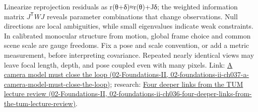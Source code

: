 Linearize reprojection residuals as r(θ+δ)≈r(θ)+Jδ; the weighted information matrix \(J^{\mathsf T}WJ\) reveals parameter combinations that change observations. Null directions are local ambiguities, while small eigenvalues indicate weak constraints. In calibrated monocular structure from motion, global frame choice and common scene scale are gauge freedoms. Fix a pose and scale convention, or add a metric measurement, before interpreting covariance. Repeated nearly identical views may leave focal length, depth, and pose coupled even with many pixels. Link: \href{../02-Foundations-II/main.pdf\#nameddest=02-foundations-ii-ch037-a-camera-model-must-close-the-loop}{A camera model must close the loop (02-Foundations-II, 02-foundations-ii-ch037-a-camera-model-must-close-the-loop)}; research: \href{../02-Foundations-II/main.pdf\#nameddest=02-foundations-ii-ch036-four-deeper-links-from-the-tum-lecture-review}{Four deeper links from the TUM lecture review (02-Foundations-II, 02-foundations-ii-ch036-four-deeper-links-from-the-tum-lecture-review)}.
